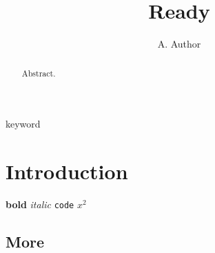 \documentclass[journal]{IEEEtran}
\begin{document}
\title{Ready}\author{A. Author}\maketitle
\begin{abstract}Abstract.\end{abstract}
\begin{IEEEkeywords}keyword\end{IEEEkeywords}
\section{Introduction} \textbf{bold} \textit{italic} \texttt{code} $x^2$ \cite{knuth}
\subsection{More}

\end{document}
